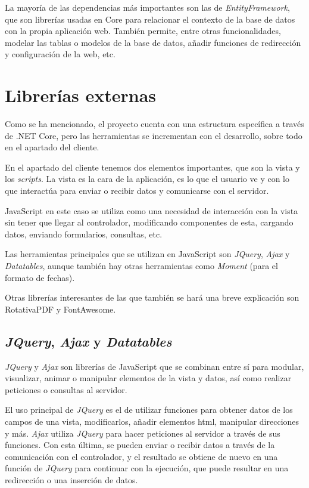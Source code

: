 La mayoría de las dependencias más importantes son las de \emph{EntityFramework}, que son librerías usadas en Core para relacionar el contexto de la base de datos con la propia aplicación web. También permite, entre otras funcionalidades, modelar las tablas o modelos de la base de datos, añadir funciones de redirección y configuración de la web, etc.

\section{Librerías externas}
Como se ha mencionado, el proyecto cuenta con una estructura específica a través de .NET Core, pero las herramientas se incrementan con el desarrollo, sobre todo en el apartado del cliente.

En el apartado del cliente tenemos dos elementos importantes, que son la vista y los \emph{scripts}.
La vista es la cara de la aplicación, es lo que el usuario ve y con lo que interactúa para enviar o recibir datos y comunicarse con el servidor.

JavaScript en este caso se utiliza como una necesidad de interacción con la vista sin tener que llegar al controlador, modificando componentes de esta, cargando datos, enviando formularios, consultas, etc.

Las herramientas principales que se utilizan en JavaScript son \emph{JQuery}, \emph{Ajax} y \emph{Datatables}, aunque también hay otras herramientas como \emph{Moment} (para el formato de fechas).

Otras librerías interesantes de las que también se hará una breve explicación son RotativaPDF y FontAwesome.

\subsection{\emph{JQuery}, \emph{Ajax} y \emph{Datatables}}
\emph{JQuery} y \emph{Ajax} son librerías de JavaScript que se combinan entre sí para modular, visualizar, animar o manipular elementos de la vista y datos, así como realizar peticiones o consultas al servidor.

El uso principal de \emph{JQuery} es el de utilizar funciones para obtener datos de los campos de una vista, modificarlos, añadir elementos html, manipular direcciones y más. \emph{Ajax} utiliza \emph{JQuery} para hacer peticiones al servidor a través de sus funciones. Con esta última, se pueden enviar o recibir datos a través de la comunicación con el controlador, y el resultado se obtiene de nuevo en una función de \emph{JQuery} para continuar con la ejecución, que puede resultar en una redirección o una inserción de datos.

